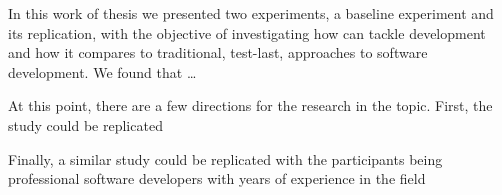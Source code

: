 In this work of thesis we presented two experiments, a baseline experiment and its replication, with the objective of investigating how \tdd can tackle \es development and how it compares to traditional, test-last, approaches to software development.
We found that \dots

At this point, there are a few directions for the research in the topic. First, the study could be replicated 


Finally, a similar study could be replicated with the participants being professional software developers with years of experience in the \es field